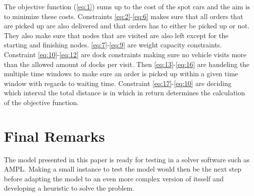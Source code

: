\documentclass[a4paper,12pt]{article}
\begin{document}
\endgroup
\par
The objective function (\ref{eq:1}) sums up to the cost of the spot cars and the aim is to minimize these costs. 
Constraints \ref{eq:2}-\ref{eq:6} makes sure that all orders that are picked up are also delivered and that orders has to either be picked up or not. They also make sure that nodes that are visited are also left except for the starting and finishing nodes.
\ref{eq:7}-\ref{eq:9} are weight capacity constraints.
Constraint \ref{eq:10}-\ref{eq:12} are dock constraints making sure no vehicle visits more than the allowed amount of docks per visit.
Then \ref{eq:13}-\ref{eq:16} are handeling the multiple time windows to make sure an order is picked up within a given time window with regards to waiting time.
Constraint \ref{eq:17}-\ref{eq:10} are deciding which interval the total distance is in which in return determines the calculation of the objective function. \newline

\section{Final Remarks}
The model presented in this paper is ready for testing in a solver software such as AMPL. Making a small instance to test the model would then be the next step before adapting the model to an even more complex version of itsself and developing a heuristic to solve the problem. 




\end{document}
